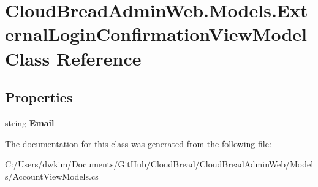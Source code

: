 \hypertarget{class_cloud_bread_admin_web_1_1_models_1_1_external_login_confirmation_view_model}{}\section{Cloud\+Bread\+Admin\+Web.\+Models.\+External\+Login\+Confirmation\+View\+Model Class Reference}
\label{class_cloud_bread_admin_web_1_1_models_1_1_external_login_confirmation_view_model}
\subsection*{Properties}
\begin{DoxyCompactItemize}
\item 
string {\bfseries Email}\hypertarget{class_cloud_bread_admin_web_1_1_models_1_1_external_login_confirmation_view_model_a2082e7aae001a613bf12bb05e0e52eea}{}\label{class_cloud_bread_admin_web_1_1_models_1_1_external_login_confirmation_view_model_a2082e7aae001a613bf12bb05e0e52eea}

\end{DoxyCompactItemize}


The documentation for this class was generated from the following file\+:\begin{DoxyCompactItemize}
\item 
C\+:/\+Users/dwkim/\+Documents/\+Git\+Hub/\+Cloud\+Bread/\+Cloud\+Bread\+Admin\+Web/\+Models/Account\+View\+Models.\+cs\end{DoxyCompactItemize}
